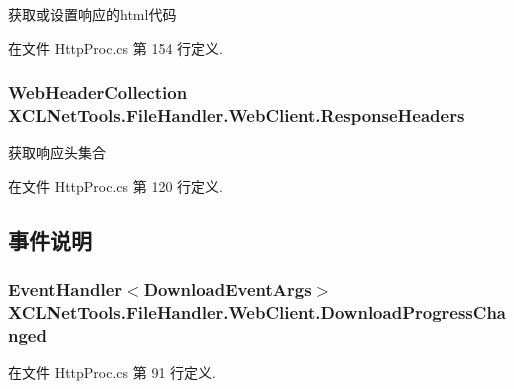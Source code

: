 获取或设置响应的html代码 



在文件 Http\-Proc.\-cs 第 154 行定义.

\hypertarget{class_x_c_l_net_tools_1_1_file_handler_1_1_web_client_a3d00d3457c23ce30274af963f4cab6bb}{
\subsubsection[{Response\-Headers}]{\setlength{\rightskip}{0pt plus 5cm}Web\-Header\-Collection X\-C\-L\-Net\-Tools.\-File\-Handler.\-Web\-Client.\-Response\-Headers\hspace{0.3cm}{\ttfamily [get]}}}\label{class_x_c_l_net_tools_1_1_file_handler_1_1_web_client_a3d00d3457c23ce30274af963f4cab6bb}


获取响应头集合 



在文件 Http\-Proc.\-cs 第 120 行定义.



\subsection{事件说明}
\hypertarget{class_x_c_l_net_tools_1_1_file_handler_1_1_web_client_aa1e50d608381b728356547eff9f80213}{
\subsubsection[{Download\-Progress\-Changed}]{\setlength{\rightskip}{0pt plus 5cm}Event\-Handler$<${\bf Download\-Event\-Args}$>$ X\-C\-L\-Net\-Tools.\-File\-Handler.\-Web\-Client.\-Download\-Progress\-Changed}}\label{class_x_c_l_net_tools_1_1_file_handler_1_1_web_client_aa1e50d608381b728356547eff9f80213}


在文件 Http\-Proc.\-cs 第 91 行定义.

